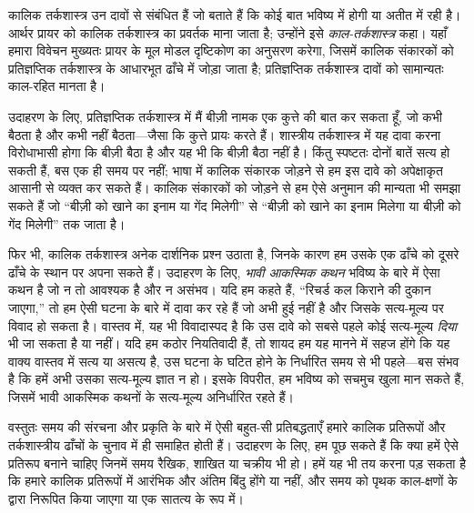 \documentclass[../../../include/open-logic-section]{subfiles}
\begin{document}


कालिक तर्कशास्त्र उन दावों से संबंधित हैं जो बताते हैं कि कोई बात भविष्य
में होगी या अतीत में रही है। आर्थर प्रायर को कालिक तर्कशास्त्र का प्रवर्तक
माना जाता है; उन्होंने इसे \emph{काल-तर्कशास्त्र} कहा। यहाँ हमारा विवेचन
मुख्यतः प्रायर के मूल मोडल दृष्टिकोण का अनुसरण करेगा, जिसमें कालिक संकारकों
को प्रतिज्ञप्तिक तर्कशास्त्र के आधारभूत ढाँचे में जोड़ा जाता है; प्रतिज्ञप्तिक
तर्कशास्त्र दावों को सामान्यतः काल-रहित मानता है।

उदाहरण के लिए, प्रतिज्ञप्तिक तर्कशास्त्र में मैं बीज़ी नामक एक कुत्ते की बात
कर सकता हूँ, जो कभी बैठता है और कभी नहीं बैठता---जैसा कि कुत्ते प्रायः करते
हैं। शास्त्रीय तर्कशास्त्र में यह दावा करना विरोधाभासी होगा कि बीज़ी बैठा है
और यह भी कि बीज़ी बैठा नहीं है। किंतु स्पष्टतः दोनों बातें सत्य हो सकती हैं,
बस एक ही समय पर नहीं; भाषा में कालिक संकारक जोड़ने से हम इस दावे को अपेक्षाकृत
आसानी से व्यक्त कर सकते हैं। कालिक संकारकों को जोड़ने से हम ऐसे अनुमान की
मान्यता भी समझा सकते हैं जो ``बीज़ी को खाने का इनाम या गेंद मिलेगी'' से
``बीज़ी को खाने का इनाम मिलेगा या बीज़ी को गेंद मिलेगी'' तक जाता है।

फिर भी, कालिक तर्कशास्त्र अनेक दार्शनिक प्रश्न उठाता है, जिनके कारण हम उसके
एक ढाँचे को दूसरे ढाँचे के स्थान पर अपना सकते हैं। उदाहरण के लिए,
\emph{भावी आकस्मिक कथन} भविष्य के बारे में ऐसा कथन है जो न तो आवश्यक है और
न असंभव। यदि हम कहते हैं, ``रिचर्ड कल किराने की दुकान जाएगा,'' तो हम ऐसी
घटना के बारे में दावा कर रहे हैं जो अभी हुई नहीं है और जिसके सत्य-मूल्य पर
विवाद हो सकता है। वास्तव में, यह भी विवादास्पद है कि उस दावे को सबसे पहले
कोई सत्य-मूल्य \emph{दिया} भी जा सकता है या नहीं। यदि हम कठोर नियतिवादी हैं,
तो शायद हम यह मानने में सहज होंगे कि यह वाक्य वास्तव में सत्य या असत्य है,
उस घटना के घटित होने के निर्धारित समय से भी पहले---बस संभव है कि हमें अभी
उसका सत्य-मूल्य ज्ञात न हो। इसके विपरीत, हम भविष्य को सचमुच खुला मान सकते
हैं, जिसमें भावी आकस्मिक कथनों के सत्य-मूल्य अनिर्धारित रहते हैं।

वस्तुतः समय की संरचना और प्रकृति के बारे में ऐसी बहुत-सी प्रतिबद्धताएँ हमारे
कालिक प्रतिरूपों और तर्कशास्त्रीय ढाँचों के चुनाव में ही समाहित होती हैं।
उदाहरण के लिए, हम पूछ सकते हैं कि क्या हमें ऐसे प्रतिरूप बनाने चाहिए जिनमें
समय रैखिक, शाखित या चक्रीय भी हो। हमें यह भी तय करना पड़ सकता है कि हमारे
कालिक प्रतिरूपों में आरंभिक और अंतिम बिंदु होंगे या नहीं, और समय को पृथक
काल-क्षणों के द्वारा निरूपित किया जाएगा या एक सातत्य के रूप में।
\end{document}
